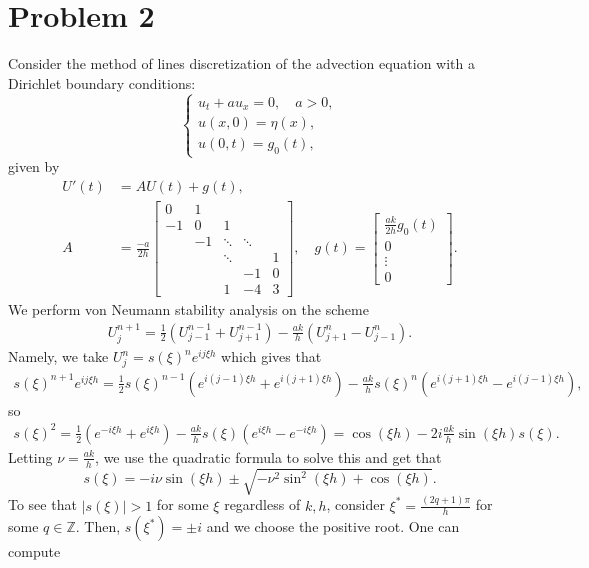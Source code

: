 \documentclass{article}
\begin{document}
\section{Problem 2}
Consider the method of lines discretization of the advection equation with a Dirichlet boundary conditions:
$$ \begin{cases} u_t + a u_{x} = 0, \quad a > 0,\\
	u(x,0) = \eta(x),\\
	u(0,t) = g_0(t), \end{cases} $$
given by
\begin{align*}
	U'(t) &= A U(t) + g(t),\\
	A &= \frac{-a}{2h} \begin{bmatrix} 0 & 1 \\
		-1 & 0 & 1 \\
		& -1 & \ddots & \ddots \\
		&& \ddots && 1\\
		&&& -1 & 0 \\
		&&1 & -4 & 3
	\end{bmatrix}, \quad g(t) = \begin{bmatrix} \frac{ak}{2h} g_0(t) \\ 0 \\ \vdots \\ 0 \end{bmatrix}.
\end{align*}
We perform von Neumann stability analysis on the scheme 
\begin{align*}
	U_j^{n+1} = \frac 1 2 ( U_{j-1}^{n-1} + U_{j+1}^{n-1}) - \frac{ak}{h} ( U_{j+1}^n - U_{j-1}^n).
\end{align*}
Namely, we take $U^n_j=s(\xi)^ne^{ij\xi h}$ which gives that 
\begin{align*}
s(\xi)^{n+1}e^{ij\xi h}=\frac{1}{2}s(\xi)^{n-1}\left(e^{i(j-1)\xi h}+e^{i(j+1)\xi h}\right)-\frac{ak}{h}s(\xi)^n\left(e^{i(j+1)\xi h}-e^{i(j-1)\xi h}\right),
\end{align*}
so
\begin{align*}
s(\xi)^2=\frac{1}{2}\left(e^{-i\xi h}+e^{i\xi h}\right)-\frac{ak}{h}s(\xi)\left(e^{i\xi h}-e^{-i\xi h}\right)=\cos(\xi h)-2i\frac{ak}{h}\sin(\xi h)s(\xi).
\end{align*}
Letting $\nu=\frac{ak}{h}$, we use the quadratic formula to solve this and get that 
\[
s(\xi)=-i\nu\sin(\xi h)\pm\sqrt{-\nu^2\sin^2(\xi h)+\cos(\xi h)}.
\] 
To see that $|s(\xi)| > 1$ for some $\xi$ regardless of $k,h$, consider $\xi^*=\frac{(2q+1)\pi}{h}$ for some $q\in\mathbb{Z}$. Then, $s(\xi^*)=\pm i$ and we choose the positive root. One can compute
\end{document}
